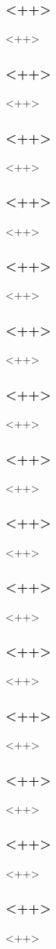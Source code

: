 \begin{frame}[fragile] 
\frametitle{<++>}
<++>
\end{frame}

\begin{frame}[fragile] 
\frametitle{<++>}
<++>
\end{frame}

\begin{frame}[fragile] 
\frametitle{<++>}
<++>
\end{frame}

\begin{frame}[fragile] 
\frametitle{<++>}
<++>
\end{frame}

\begin{frame}[fragile] 
\frametitle{<++>}
<++>
\end{frame}

\begin{frame}[fragile] 
\frametitle{<++>}
<++>
\end{frame}

\begin{frame}[fragile] 
\frametitle{<++>}
<++>
\end{frame}

\begin{frame}[fragile] 
\frametitle{<++>}
<++>
\end{frame}

\begin{frame}[fragile] 
\frametitle{<++>}
<++>
\end{frame}

\begin{frame}[fragile] 
\frametitle{<++>}
<++>
\end{frame}

\begin{frame}[fragile] 
\frametitle{<++>}
<++>
\end{frame}

\begin{frame}[fragile] 
\frametitle{<++>}
<++>
\end{frame}

\begin{frame}[fragile] 
\frametitle{<++>}
<++>
\end{frame}

\begin{frame}[fragile] 
\frametitle{<++>}
<++>
\end{frame}

\begin{frame}[fragile] 
\frametitle{<++>}
<++>
\end{frame}

